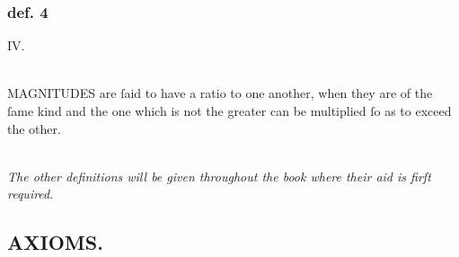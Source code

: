 \begin{center}
\begin{minipage}{0.8\textwidth}
        \subsubsection{def. 4}
        \begin{center}
            IV.\label{book5def4}\\
            \hfill\\
            \raggedright M\textsc{AGNITUDES} are ſaid to have a ratio to one another, when they are of the ſame kind and the one which is not the greater can be multiplied ſo as to exceed the other.
        \end{center}
        \hfill\\
        \textit{The other definitions will be given throughout the book where their aid is firſt required}.
    \end{minipage}
\end{center}

\newpage

\subsection[Axioms]{\centering \scshape{\LARGE{AXIOMS.}}}
\label{subsec:axioms}

\hfill

